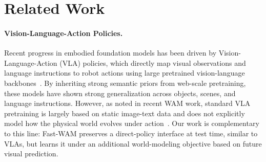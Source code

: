 \documentclass{article}
\begin{document}


\section{Related Work}

\paragraph{Vision-Language-Action Policies.}
Recent progress in embodied foundation models has been driven by Vision-Language-Action (VLA) policies, which directly map visual observations and language instructions to robot actions using large pretrained vision-language backbones~\cite{kim2024openvla, black2024pi_0, intelligence2025pi_, bjorck2025gr00t, zitkovich2023rt, liu2024rdt, bu2025agibot, shukor2025smolvla, team2025gemini, galaxea2025, wen2025dexvla}. By inheriting strong semantic priors from web-scale pretraining, these models have shown strong generalization across objects, scenes, and language instructions. However, as noted in recent WAM work, standard VLA pretraining is largely based on static image-text data and does not explicitly model how the physical world evolves under action~\cite{lingbot-va2026, ye2026worldactionmodelszeroshot}. Our work is complementary to this line: Fast-WAM preserves a direct-policy interface at test time, similar to VLAs, but learns it under an additional world-modeling objective based on future visual prediction.
\end{document}
